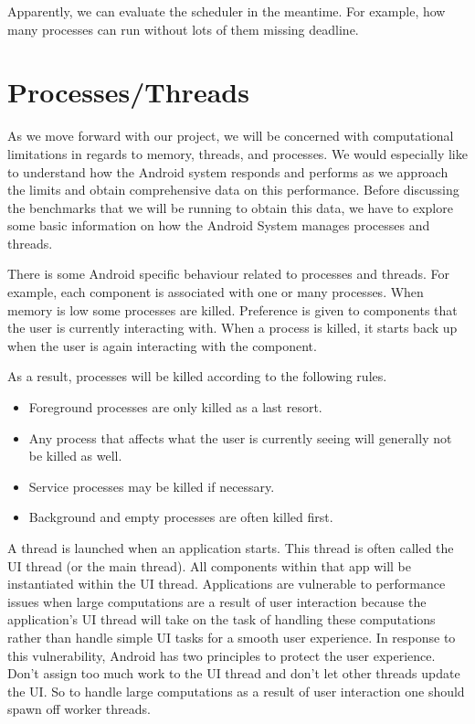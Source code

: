 \documentclass[11pt]{article}
\begin{document}
Apparently, we can evaluate the scheduler in the meantime.
For example, how many processes can run without lots of them missing deadline.

\section{\label{Processes/Threads}Processes/Threads}
\label{sec-5}
As we move forward with our project, we will be concerned with computational limitations in regards to memory, threads, and processes.  We would especially like to understand how the Android system responds and performs as we approach the limits and obtain comprehensive data on this performance.  Before discussing the benchmarks that we will be running to obtain this data, we have to explore some basic information on how the Android System manages processes and threads.

There is some Android specific behaviour related to processes and threads.  For example, each component is associated with one or many processes.  When memory is low some processes are killed.  Preference is given to components that the user is currently interacting with.  When a process is killed, it starts back up when the user is again interacting with the component.

As a result, processes will be killed according to the following rules.

\begin{itemize}
\item Foreground processes are only killed as a last resort.
\item Any process that affects what the user is currently seeing will generally not be killed as well.
\item Service processes may be killed if necessary.
\item Background and empty processes are often killed first.
\end{itemize}

A thread is launched when an application starts.  This thread is often called the UI thread (or the main thread).  All components within that app will be instantiated within the UI thread.  Applications are vulnerable to performance issues when large computations are a result of user interaction because the application’s UI thread will take on the task of handling these computations rather than handle simple UI tasks for a smooth user experience.  In response to this vulnerability, Android has two principles to protect the user experience.  Don’t assign too much work to the UI thread and don’t let other threads update the UI.  So to handle large computations as a result of user interaction one should spawn off worker threads.
\end{document}
